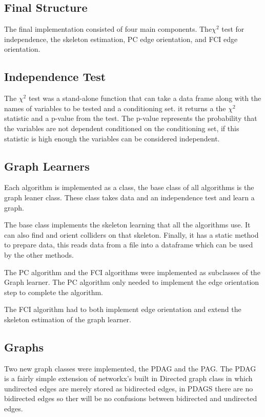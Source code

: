 \documentclass{UoYCSproject}
\begin{document}
\subsection{Final Structure}
The final implementation consisted of four main components. The$\chi^2$ test for independence, the skeleton estimation, PC edge orientation, and FCI edge orientation.

\subsection{Independence Test}
The $\chi^2$ test was a stand-alone function that can take a data frame along with the names of variables to be tested and a conditioning set. it returns a the $\chi^2$ statistic and a p-value from the test. The p-value represents the probability that the variables are not dependent conditioned on the conditioning set, if this statistic is high enough the variables can be considered independent.

\subsection{Graph Learners}
Each algorithm is implemented as a class, the base class of all algorithms is the graph leaner class. These class takes data and an independence test and learn a graph.

The base class implements the skeleton learning that all the algorithms use. It can also find and orient colliders on that skeleton. Finally, it has a static method to prepare data, this reads data from a file into a dataframe which can be used by the other methods.

The PC algorithm and the FCI algorithms were implemented as subclasses of the Graph learner. The PC algorithm only needed to implement the edge orientation step to complete the algorithm.

The FCI algorithm had to both implement edge orientation and extend the skeleton estimation of the graph learner.


\subsection{Graphs}  
Two new graph classes were implemented, the PDAG and the PAG. The PDAG is a fairly simple extension of networkx's built in Directed graph class in which undirected edges are merely stored as bidirected edges, in PDAGS there are no bidirected edges so ther will be no confusions between bidirected and undirected edges.
\end{document}
